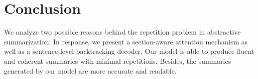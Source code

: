\section{Conclusion}
\label{sec:conclude}
We analyze two possible reasons behind the repetition problem in abstractive
summarization.  In response, we present a section-aware attention mechanism 
as well as a sentence-level backtracking decoder. Our model is able 
to produce fluent and coherent summaries with minimal repetitions.
Besides, the summaries generated by our model are more accurate and 
readable. 

